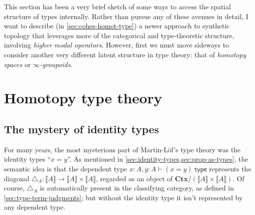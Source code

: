 \documentclass[10pt]{article}
\def\oo{\ensuremath{\infty}}
\def\ty{\;\mathsf{type}}
\def\m#1{\llbracket#1\rrbracket}
\def\types{\vdash}
\def\diag{\triangle}
\def\Ctx{\mathbf{Ctx}}
\numberwithin{equation}{section}
\begin{document}
This section has been a very brief sketch of some ways to access the spatial structure of types internally.
Rather than pursue any of these avenues in detail, I want to describe (in \cref{sec:cohes-homot-type}) a newer approach to synthetic topology that leverages more of the categorical and type-theoretic structure, involving \emph{higher modal operators}.
However, first we must move sideways to consider another very different latent structure in type theory: that of \emph{homotopy spaces} or \emph{\oo-groupoids}.


\section{Homotopy type theory}
\label{sec:homotopy-type-theory}

\subsection{The mystery of identity types}
\label{sec:myst-ident-types}

For many years, the most mysterious part of Martin-L\"{o}f's type theory was the identity types ``$x=y$''.
As mentioned in \cref{sec:identity-types,sec:prop-as-types}, the semantic idea is that the dependent type $x:A,y:A\types (x=y)\ty$ represents the diagonal $\diag_A:\m A \to \m A\times \m A$, regarded as an object of $\Ctx/(\m A\times \m A)$. %
Of course, $\diag_A$ is automatically present in the classifying category, as defined in \cref{sec:type-term-judgments}; but without the identity type it isn't represented by any dependent type.
\end{document}
